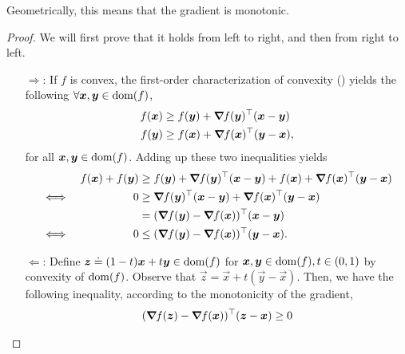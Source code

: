 Geometrically, this means that the gradient is monotonic.

\begin{proof}
    We will first prove that it holds from left to right, and then from right to left.

    \begin{enumerate}
        \item[$\Rightarrow$:] If $f$ is convex, the first-order characterization of convexity () yields the following $\forall \bm{x}, \bm{y} \in \mathrm{dom}(f)$,
              \begin{align*}
                  f(\bm{x}) & \geq f(\bm{y}) + \bm{\nabla}_{\! } f(\bm{y})^\top (\bm{x}-\bm{y})  \\
                  f(\bm{y}) & \geq f(\bm{x}) + \bm{\nabla}_{\! } f(\bm{x})^\top (\bm{y}-\bm{x}),
              \end{align*}
              for all $\bm{x},\bm{y}\in\mathrm{dom}(f)$. Adding up these two inequalities yields
              \begin{align*}
                       &  & f(\vec{x}) + f(\vec{y}) & \geq f(\vec{y}) + \transpose{\grad{f(\vec{y})}{}} (\vec{x}-\vec{y}) + f(\vec{x}) + \transpose{\grad{f(\vec{x})}{}} (\vec{y}-\vec{x}) \\
                  \iff &  & 0                       & \geq \transpose{\grad{f(\vec{y})}{}} (\vec{x}-\vec{y}) + \transpose{\grad{f(\vec{x})}{}} (\vec{y}-\vec{x})                           \\
                       &  &                         & = \transpose{(\grad{f(\vec{y})}{} - \grad{f(\vec{x})}{})} (\vec{x} - \vec{y})                                                        \\
                  \iff &  & 0                       & \leq \transpose{(\grad{f(\vec{y})}{} - \grad{f(\vec{x})}{})} (\vec{y} - \vec{x}).
              \end{align*}
        \item[$\Leftarrow$:] Define $\bm{z} \doteq (1-t) \bm{x} + t\bm{y} \in \mathrm{dom}(f)$ for
              $\bm{x},\bm{y}\in\mathrm{dom}(f), t \in (0,1)$ by convexity of $\mathrm{dom}(f)$. Observe that
              $\vec{z} = \vec{x} + t(\vec{y}-\vec{x})$. Then, we have the following inequality, according
              to the monotonicity of the gradient,
              \begin{align*}
                  \transpose{(\grad{f(\vec{z})}{} - \grad{f(\vec{x})}{})} (\vec{z} - \vec{x})                                           & \geq 0                            \\

\end{align*}
\end{enumerate}
\end{proof}
